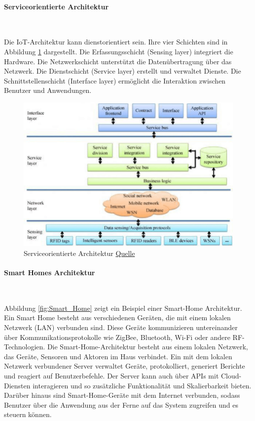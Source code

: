 \paragraph{Serviceorientierte Architektur}\

Die IoT-Architektur kann dienstorientiert sein. Ihre vier Schichten sind in Abbildung \ref{fig:Serviceorientierte} dargestellt. Die Erfassungsschicht (Sensing layer) integriert die Hardware. Die Netzwerkschicht unterstützt die Datenübertragung über das Netzwerk. Die Dienstschicht (Service layer) erstellt und verwaltet Dienste. Die Schnittstellenschicht (Interface layer) ermöglicht die Interaktion zwischen Benutzer und Anwendungen\cite{8203943}.


\begin{figure}[h]
  \centering
  \includegraphics[scale=0.3]{resources/oT-service-oriented-architecture.png}
  \caption{Serviceorientierte Architektur \href{https://www.researchgate.net/figure/oT-service-oriented-architecture_fig1_348398089}{Quelle}}
  \label{fig:Serviceorientierte}
\end{figure}
\paragraph{Smart Homes Architektur}\

 Abbildung \ref{fig:Smart_Home} zeigt ein Beispiel einer Smart-Home Architektur.
Ein Smart Home besteht aus verschiedenen Geräten, die mit einem lokalen Netzwerk (LAN) verbunden sind. Diese Geräte kommunizieren untereinander über Kommunikationsprotokolle wie ZigBee, Bluetooth, Wi-Fi oder andere RF-Technologien. Die Smart-Home-Architektur besteht aus einem lokalen Netzwerk, das Geräte, Sensoren und Aktoren im Haus verbindet. Ein mit dem lokalen Netzwerk verbundener Server verwaltet Geräte, protokolliert, generiert Berichte und reagiert auf Benutzerbefehle. Der Server kann auch über APIs mit Cloud-Diensten interagieren und so zusätzliche Funktionalität und Skalierbarkeit bieten. Darüber hinaus sind Smart-Home-Geräte mit dem Internet verbunden, sodass Benutzer über die Anwendung aus der Ferne auf das System zugreifen und es steuern können\cite{djumanazarov2021overview}. 

